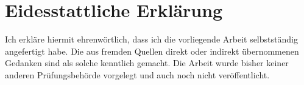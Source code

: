 \documentclass[Bachelorarbeit.tex]{subfiles}
\begin{document}
\chapter*{Eidesstattliche Erklärung}
Ich erkläre hiermit ehrenwörtlich, dass ich die vorliegende Arbeit selbstständig angefertigt habe. Die aus fremden Quellen direkt oder indirekt übernommenen Gedanken sind als solche kenntlich gemacht. Die Arbeit wurde bisher keiner anderen Prüfungsbehörde vorgelegt und auch noch nicht veröffentlicht.
\end{document}

